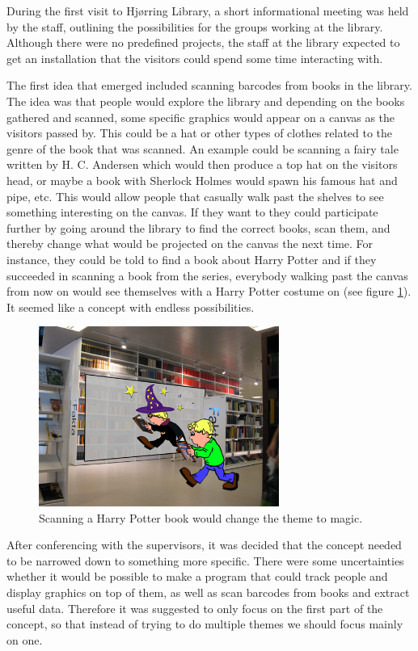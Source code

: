 During the first visit to Hj{\o}rring Library, a short informational meeting was held by the staff, outlining the possibilities for the groups working at the library. Although there were no predefined projects, the staff at the library expected to get an installation that the visitors could spend some time interacting with.

The first idea that emerged included scanning barcodes from books in the library. The idea was that people would explore the library and depending on the books gathered and scanned, some specific graphics would appear on a canvas as the visitors passed by. This could be a hat or other types of clothes related to the genre of the book that was scanned. An example could be scanning a fairy tale written by H. C. Andersen which would then produce a top hat on the visitors head, or maybe a book with Sherlock Holmes would spawn his famous hat and pipe, etc. This would allow people that casually walk past the shelves to see something interesting on the canvas. If they want to they could participate further by going around the library to find the correct books, scan them, and thereby change what would be projected on the canvas the next time. For instance, they could be told to find a book about Harry Potter and if they succeeded in scanning a book from the series, everybody walking past the canvas from now on would see themselves with a Harry Potter costume on (see figure \ref{fig:bookTheme}). It seemed like a concept with endless possibilities.

\begin{figure}[htbp]
\centering
\includegraphics[width=0.7\textwidth]{Pictures/HjoerringLibrary/magician.png}
\caption{Scanning a Harry Potter book would change the theme to magic.}
\label{fig:bookTheme}
\end{figure}

After conferencing with the supervisors, it was decided that the concept needed to be narrowed down to something more specific. There were some uncertainties whether it would be possible to make a program that could track people and display graphics on top of them, as well as scan barcodes from books and extract useful data. Therefore it was suggested to only focus on the first part of the concept, so that instead of trying to do multiple themes we should focus mainly on one.

